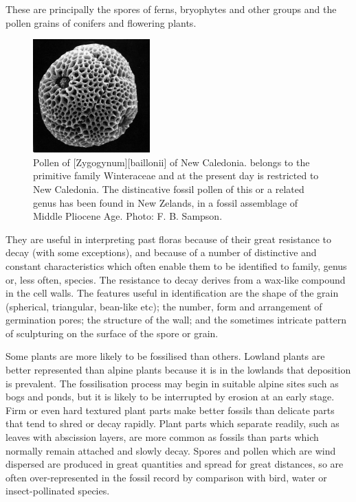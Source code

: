 These are principally the spores of ferns, bryophytes and other groups and the pollen grains of conifers and flowering plants.
\begin{figure}
	\includegraphics[width=0.4\textwidth]{graphics/figure122pollen.jpg}
	\centering
	\caption[Pollen of \emph{Zygogynum baillonii} of New Caledonia]{Pollen of [Zygogynum][baillonii] of New Caledonia.
	 belongs to the primitive family Winteraceae and at the present day is restricted to New Caledonia.
	The distincative fossil pollen of this or a related genus has been found in New Zelands, in a fossil assemblage of Middle Pliocene Age.
	Photo: F. B. Sampson.}%
	\label{fig:122pollen}
\end{figure}
They are useful in interpreting past floras because of their great resistance to decay (with some exceptions), and because of a number of distinctive and constant characteristics which often enable them to be identified to family, genus or, less often, species.
The resistance to decay derives from a wax-like compound in the cell walls.
The features useful in identification are the shape of the grain (spherical, triangular, bean-like etc); the number, form and arrangement of germination pores; the structure of the wall; and the sometimes intricate pattern of sculpturing on the surface of the spore or grain.

Some plants are more likely to be fossilised than others.
Lowland plants are better represented than alpine plants because it is in the lowlands that deposition is prevalent.
The fossilisation process may begin in suitable alpine sites such as bogs and ponds, but it is likely to be interrupted by erosion at an early stage.
Firm or even hard textured plant parts make better fossils than delicate parts that tend to shred or decay rapidly.
Plant parts which separate readily, such as leaves with abscission layers, are more common as fossils than parts which normally remain attached and slowly decay.
Spores and pollen which are wind dispersed are produced in great quantities and spread for great distances, so are often over-represented in the fossil record by comparison with bird, water or insect-pollinated species.

